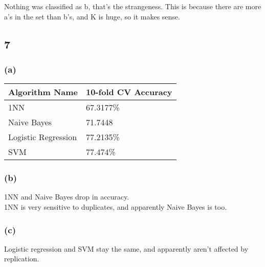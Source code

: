\documentclass[12pt]{article}
\begin{document}
	Nothing was classified as b, that's the strangeness. This is because there are more a's in the set than b's, and K is huge, so it makes sense.
	
	\subsection*{7}
	\subsubsection*{(a)}
	
	\begin{tabular}{| l | l |}
		\hline
		Algorithm Name & 10-fold CV Accuracy \\
		\hline
		1NN & 67.3177\% \\
		Naive Bayes & 71.7448\\
		Logistic Regression & 77.2135\% \\
		SVM & 77.474\% \\
		\hline
	\end{tabular}
	
	\subsubsection*{(b)}
	1NN and Naive Bayes drop in accuracy. \\
	1NN is very sensitive to duplicates, and apparently Naive Bayes is too.
	
	\subsubsection*{(c)}
	Logistic regression and SVM stay the same, and apparently aren't affected by replication.
	
\end{document}
